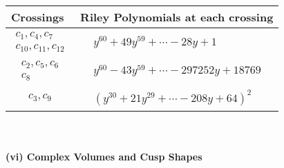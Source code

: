 \documentclass[1p]{elsarticle_modified}
\theoremstyle{definition}
\begin{document}
\begin{tabular}{m{50pt}|m{274pt}}
Crossings & \hspace{64pt}Riley Polynomials at each crossing \\
\hline $$\begin{aligned}c_{1},c_{4},c_{7}\\c_{10},c_{11},c_{12}\end{aligned}$$&$\begin{aligned}
&y^{60}+49 y^{59}+\cdots-28 y+1
\end{aligned}$\\
\hline $$\begin{aligned}c_{2},c_{5},c_{6}\\c_{8}\end{aligned}$$&$\begin{aligned}
&y^{60}-43 y^{59}+\cdots-297252 y+18769
\end{aligned}$\\
\hline $$\begin{aligned}c_{3},c_{9}\end{aligned}$$&$\begin{aligned}
&(y^{30}+21 y^{29}+\cdots-208 y+64)^{2}
\end{aligned}$\\
\hline
\end{tabular}\\~\\
\newpage\flushleft \textbf{(vi) Complex Volumes and Cusp Shapes}
\end{document}
